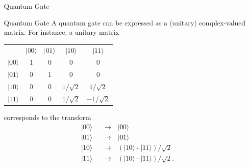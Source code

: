 \documentclass{beamer}
\renewcommand{\:}{\text{ }}
\begin{document}
    \begin{frame}{Quantum Gate}
        \begin{block}{Quantum Gate}
            A \alert{quantum gate} can be expressed as a (unitary) complex-valued matrix. For instance, a unitary matrix
            \begin{table}
                \small
                \centering
                \begin{tabular}{ccccc}
                                                            & $\vert 00 \rangle$ & $\vert 01 \rangle$ & $\vert 10 \rangle$ & $\vert 11 \rangle$                 \\
                    \multicolumn{1}{c|}{$\vert 00 \rangle$} & 1                  & 0                  & 0                  & \multicolumn{1}{c|}{0}             \\
                    \multicolumn{1}{c|}{$\vert 01 \rangle$} & 0                  & 1                  & 0                  & \multicolumn{1}{c|}{0}             \\
                    \multicolumn{1}{c|}{$\vert 10 \rangle$} & 0                  & 0                  & $1/\sqrt{2}$       & \multicolumn{1}{c|}{$1/\sqrt{2}$}  \\
                    \multicolumn{1}{c|}{$\vert 11 \rangle$} & 0                  & 0                  & $1/\sqrt{2}$       & \multicolumn{1}{c|}{$-1/\sqrt{2}$}
                \end{tabular}
            \end{table}
            corresponds to the transform
            \small
            \begin{align*}
                \vert 00 \rangle & \:\longrightarrow\: \vert 00 \rangle \\
                \vert 01 \rangle & \:\longrightarrow\: \vert 01 \rangle \\
                \vert 10 \rangle & \:\longrightarrow\: (\vert 10 \rangle + \vert 11 \rangle) / \sqrt{2} \\
                \vert 11 \rangle & \:\longrightarrow\: (\vert 10 \rangle - \vert 11 \rangle) / \sqrt{2}\text{.}
            \end{align*}
        \end{block}
    \end{frame}
\end{document}

